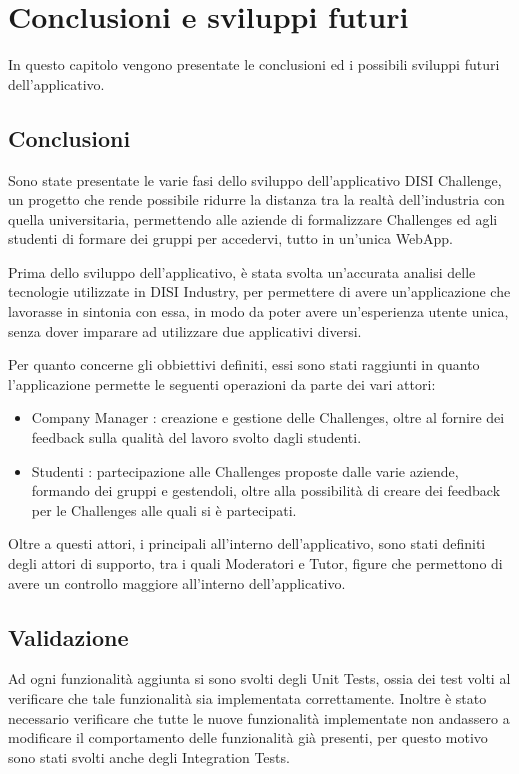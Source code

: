 \chapter{Conclusioni e sviluppi futuri}
\label{cha:conclusioni}
In questo capitolo vengono presentate le conclusioni ed i possibili sviluppi futuri dell'applicativo.

\section{Conclusioni}
Sono state presentate le varie fasi dello sviluppo dell'applicativo DISI Challenge, un progetto che rende possibile ridurre la distanza tra la realtà dell'industria con quella universitaria, permettendo alle aziende di formalizzare Challenges ed agli studenti di formare dei gruppi per accedervi, tutto in un'unica WebApp.

Prima dello sviluppo dell'applicativo, è stata svolta un'accurata analisi delle tecnologie utilizzate in DISI Industry, per permettere di avere un'applicazione che lavorasse in sintonia con essa, in modo da poter avere un'esperienza utente unica, senza dover imparare ad utilizzare due applicativi diversi.

Per quanto concerne gli obbiettivi definiti, essi sono stati raggiunti in quanto l'applicazione permette le seguenti operazioni da parte dei vari attori:
\begin{itemize}
    \item Company Manager : creazione e gestione delle Challenges, oltre al fornire dei feedback sulla qualità del lavoro svolto dagli studenti.
    \item Studenti : partecipazione alle Challenges proposte dalle varie aziende, formando dei gruppi e gestendoli, oltre alla possibilità di creare dei feedback per le Challenges alle quali si è partecipati.
\end{itemize}

Oltre a questi attori, i principali all'interno dell'applicativo, sono stati definiti degli attori di supporto, tra i quali Moderatori e Tutor, figure che permettono di avere un controllo maggiore all'interno dell'applicativo.


\section{Validazione}
Ad ogni funzionalità aggiunta si sono svolti degli Unit Tests, ossia dei test volti al verificare che tale funzionalità sia implementata correttamente. Inoltre è stato necessario verificare che tutte le nuove funzionalità implementate non andassero a modificare il comportamento delle funzionalità già presenti, per questo motivo sono stati svolti anche degli Integration Tests.

